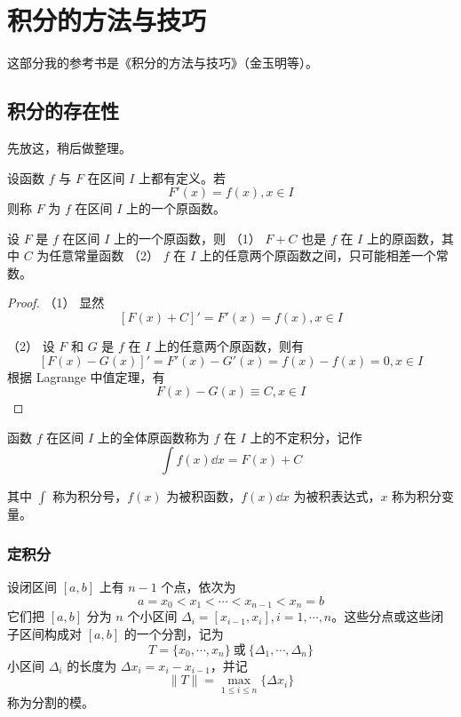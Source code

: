 
\chapter{积分的方法与技巧}

这部分我的参考书是《积分的方法与技巧》（金玉明等）。

\section{积分的存在性}

先放这，稍后做整理。

\begin{definition}
    设函数 $f$ 与 $F$ 在区间 $I$ 上都有定义。若
    $$F'(x) = f(x), x\in I$$
    则称 $F$ 为 $f$ 在区间 $I$ 上的一个原函数。
\end{definition}

\begin{theorem}
    设 $F$ 是 $f$ 在区间 $I$ 上的一个原函数，则
    （1） $F+C$ 也是 $f$ 在 $I$ 上的原函数，其中 $C$ 为任意常量函数
    （2） $f$ 在 $I$ 上的任意两个原函数之间，只可能相差一个常数。
\end{theorem}
\begin{proof}
    （1） 显然
    $$\left[ F(x)+C \right]' = F'(x) = f(x), x\in I$$
    
    （2） 设 $F$ 和 $G$ 是 $f$ 在 $I$ 上的任意两个原函数，则有
    $$\left[ F(x)-G(x) \right]' = F'(x) - G'(x) = f(x) - f(x) = 0, x\in I$$
    根据 Lagrange 中值定理，有
    $$F(x) - G(x) \equiv C, x\in I$$
\end{proof}

\begin{definition}
    函数 $f$ 在区间 $I$ 上的全体原函数称为 $f$ 在 $I$ 上的不定积分，记作
    $$\int f(x) \dd x = F(x) + C$$
\end{definition}

其中 $\displaystyle\int$ 称为积分号，$f(x)$ 为被积函数，$f(x)\dd x$ 为被积表达式，$x$ 称为积分变量。

\subsection{定积分}

设闭区间 $[a,b]$ 上有 $n-1$ 个点，依次为
$$a = x_0 < x_1 < \cdots < x_{n-1} < x_n = b$$
它们把 $[a,b]$ 分为 $n$ 个小区间 $\Delta_i = [x_{i-1},x_i], i=1,\cdots,n$。这些分点或这些闭子区间构成对 $[a,b]$ 的一个分割，记为
$$T=\{x_0,\cdots,x_n\}\ \text{或}\ \{\Delta_1,\cdots,\Delta_n\}$$
小区间 $\Delta_i$ 的长度为 $\Delta x_i = x_i-x_{i-1}$，并记 
$$\| T \| = \max_{1 \leqslant i \leqslant n}\{\Delta x_i\}$$
称为分割的模。

